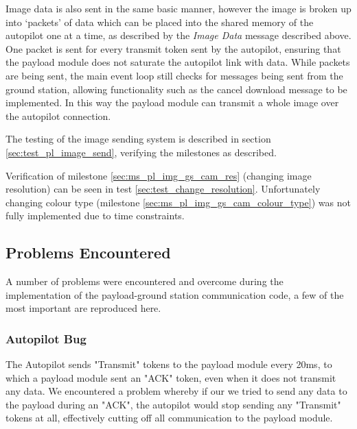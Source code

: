 Image data is also sent in the same basic manner, however the image is broken up into `packets' of data
which can be placed into the shared memory of the autopilot one at a time, as described by the \emph{Image Data}
message described above. One packet is sent for every transmit token sent by the autopilot, ensuring that the
payload module does not saturate the autopilot link with data. While packets are being sent, the main event loop
still checks for messages being sent from the ground station, allowing functionality such as the cancel download message 
to be implemented. In this way the payload module can transmit a whole image over the autopilot connection.

The testing of the image sending system is described in section \ref{sec:test_pl_image_send}, verifying the milestones 
as described.

Verification of milestone \ref{sec:ms_pl_img_gs_cam_res} (changing image resolution) can be seen in test \ref{sec:test_change_resolution}. Unfortunately changing colour type (milestone \ref{sec:ms_pl_img_gs_cam_colour_type})  was not fully implemented due to time constraints.

\subsection{Problems Encountered}
A number of problems were encountered and overcome during the implementation of the payload-ground station
communication code, a few of the most important are reproduced here.

\subsubsection*{Autopilot Bug}

The Autopilot sends "Transmit" tokens to the payload module every 20ms, 
to which a payload module sent an "ACK" token, even when it does not 
transmit any data. We encountered a problem whereby if our we tried to 
send any data to the payload during an "ACK", the autopilot would stop 
sending any "Transmit" tokens at all, effectively cutting off all 
communication to the payload module.

